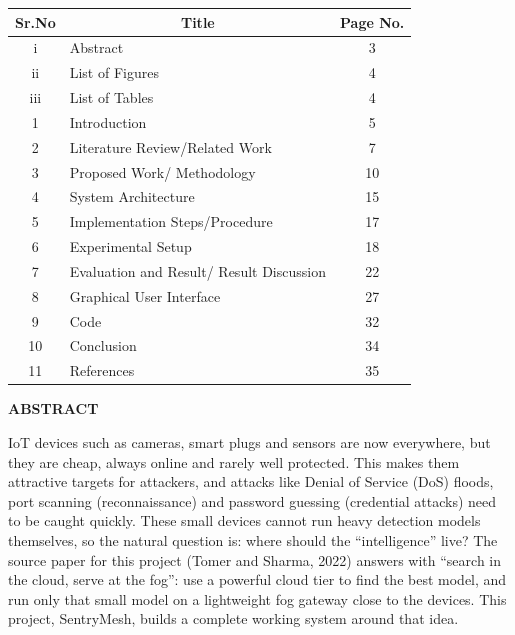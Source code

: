 \documentclass[12pt,a4paper]{article}
\begin{document}
\begin{center}
\renewcommand{\arraystretch}{1.6}

\noindent
\begin{tabular}{|c|p{10.1cm}|c|}
\hline
\textbf{Sr.No} & \multicolumn{1}{c|}{\textbf{Title}} & \textbf{Page No.} \\
\hline
i & Abstract & 3 \\
\hline
ii & List of Figures & 4 \\
\hline
iii & List of Tables & 4 \\
\hline
1 & Introduction & 5 \\
\hline
2 & Literature Review/Related Work & 7 \\
\hline
3 & Proposed Work/ Methodology & 10 \\
\hline
4 & System Architecture & 15 \\
\hline
5 & Implementation Steps/Procedure & 17 \\
\hline
6 & Experimental Setup & 18 \\
\hline
7 & Evaluation and Result/ Result Discussion & 22 \\
\hline
8 & Graphical User Interface & 27 \\
\hline
9 & Code & 32 \\
\hline
10 & Conclusion & 34 \\
\hline
11 & References & 35 \\
\hline
\end{tabular}
\end{center}

\clearpage

\begin{center}
    \textbf{\Large ABSTRACT}
\end{center}

IoT devices such as cameras, smart plugs and sensors are now everywhere, but they are
cheap, always online and rarely well protected. This makes them attractive targets for
attackers, and attacks like Denial of Service (DoS) floods, port scanning
(reconnaissance) and password guessing (credential attacks) need to be caught quickly.
These small devices cannot run heavy detection models themselves, so the natural
question is: where should the ``intelligence'' live? The source paper for this project
(Tomer and Sharma, 2022) answers with ``search in the cloud, serve at the fog'': use a
powerful cloud tier to find the best model, and run only that small model on a
lightweight fog gateway close to the devices. This project, SentryMesh, builds a
complete working system around that idea.
\end{document}
